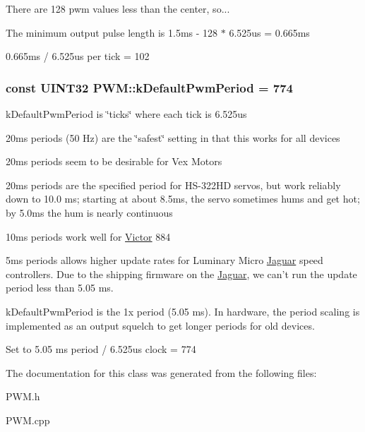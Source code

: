 \begin{DoxyItemize}
\item There are 128 pwm values less than the center, so...
\item The minimum output pulse length is 1.5ms -\/ 128 $\ast$ 6.525us = 0.665ms
\item 0.665ms / 6.525us per tick = 102 
\end{DoxyItemize}\hypertarget{classPWM_ad76e35266df11ca46f9792492671379a}{
\subsubsection[{kDefaultPwmPeriod}]{\setlength{\rightskip}{0pt plus 5cm}const UINT32 {\bf PWM::kDefaultPwmPeriod} = 774}}
\label{classPWM_ad76e35266df11ca46f9792492671379a}
kDefaultPwmPeriod is \char`\"{}ticks\char`\"{} where each tick is 6.525us


\begin{DoxyItemize}
\item 20ms periods (50 Hz) are the \char`\"{}safest\char`\"{} setting in that this works for all devices
\item 20ms periods seem to be desirable for Vex Motors
\item 20ms periods are the specified period for HS-\/322HD servos, but work reliably down to 10.0 ms; starting at about 8.5ms, the servo sometimes hums and get hot; by 5.0ms the hum is nearly continuous
\item 10ms periods work well for \hyperlink{classVictor}{Victor} 884
\item 5ms periods allows higher update rates for Luminary Micro \hyperlink{classJaguar}{Jaguar} speed controllers. Due to the shipping firmware on the \hyperlink{classJaguar}{Jaguar}, we can't run the update period less than 5.05 ms.
\end{DoxyItemize}

kDefaultPwmPeriod is the 1x period (5.05 ms). In hardware, the period scaling is implemented as an output squelch to get longer periods for old devices.

Set to 5.05 ms period / 6.525us clock = 774 

The documentation for this class was generated from the following files:\begin{DoxyCompactItemize}
\item 
PWM.h\item 
PWM.cpp\end{DoxyCompactItemize}
